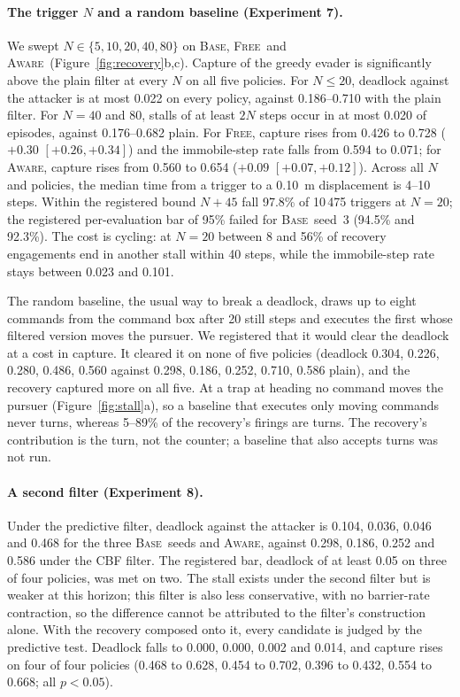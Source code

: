 \documentclass{l4dc2027}
\newcommand{\Base}{\textsc{Base}}
\newcommand{\Free}{\textsc{Free}}
\newcommand{\Aware}{\textsc{Aware}}
\begin{document}
\paragraph{The trigger $N$ and a random baseline (Experiment 7).} We swept $N \in \{5, 10, 20, 40, 80\}$ on \Base, \Free\ and \Aware\ (Figure~\ref{fig:recovery}b,c). Capture of the greedy evader is significantly above the plain filter at every $N$ on all five policies. For $N \le 20$, deadlock against the attacker is at most 0.022 on every policy, against 0.186--0.710 with the plain filter. For $N = 40$ and 80, stalls of at least $2N$ steps occur in at most 0.020 of episodes, against 0.176--0.682 plain. For \Free, capture rises from 0.426 to 0.728 ($+0.30$ $[+0.26, +0.34]$) and the immobile-step rate falls from 0.594 to 0.071; for \Aware, capture rises from 0.560 to 0.654 ($+0.09$ $[+0.07, +0.12]$). Across all $N$ and policies, the median time from a trigger to a \SI{0.10}{m} displacement is 4--10 steps. Within the registered bound $N + 45$ fall 97.8\% of 10\,475 triggers at $N = 20$; the registered per-evaluation bar of 95\% failed for \Base\ seed~3 (94.5\% and 92.3\%). The cost is cycling: at $N = 20$ between 8 and 56\% of recovery engagements end in another stall within 40 steps, while the immobile-step rate stays between 0.023 and 0.101.

The random baseline, the usual way to break a deadlock, draws up to eight commands from the command box after 20 still steps and executes the first whose filtered version moves the pursuer. We registered that it would clear the deadlock at a cost in capture. It cleared it on none of five policies (deadlock 0.304, 0.226, 0.280, 0.486, 0.560 against 0.298, 0.186, 0.252, 0.710, 0.586 plain), and the recovery captured more on all five. At a trap at heading no command moves the pursuer (Figure~\ref{fig:stall}a), so a baseline that executes only moving commands never turns, whereas 5--89\% of the recovery's firings are turns. The recovery's contribution is the turn, not the counter; a baseline that also accepts turns was not run.

\paragraph{A second filter (Experiment 8).} Under the predictive filter, deadlock against the attacker is 0.104, 0.036, 0.046 and 0.468 for the three \Base\ seeds and \Aware, against 0.298, 0.186, 0.252 and 0.586 under the CBF filter. The registered bar, deadlock of at least 0.05 on three of four policies, was met on two. The stall exists under the second filter but is weaker at this horizon; this filter is also less conservative, with no barrier-rate contraction, so the difference cannot be attributed to the filter's construction alone. With the recovery composed onto it, every candidate is judged by the predictive test. Deadlock falls to 0.000, 0.000, 0.002 and 0.014, and capture rises on four of four policies (0.468 to 0.628, 0.454 to 0.702, 0.396 to 0.432, 0.554 to 0.668; all $p < 0.05$).
\end{document}
